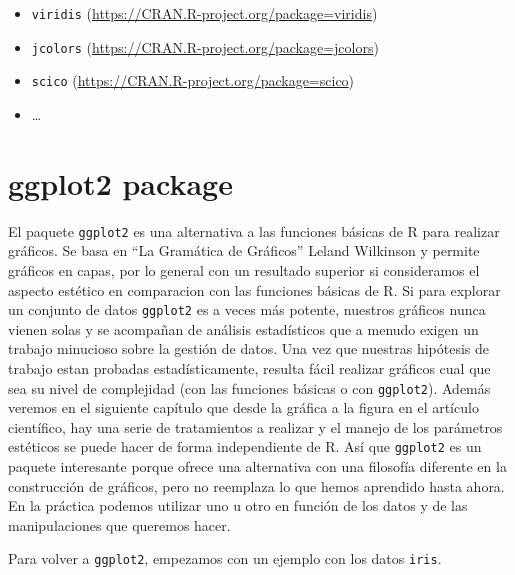 \documentclass[
]{book}
\providecommand{\tightlist}{%
  \setlength{\itemsep}{0pt}\setlength{\parskip}{0pt}}
\begin{document}
\begin{itemize}
\tightlist
\item
  \texttt{viridis} (\url{https://CRAN.R-project.org/package=viridis})
\item
  \texttt{jcolors} (\url{https://CRAN.R-project.org/package=jcolors})
\item
  \texttt{scico} (\url{https://CRAN.R-project.org/package=scico})
\item
  \ldots{}
\end{itemize}

\hypertarget{ggplot2-package}{%
\section{ggplot2 package}\label{ggplot2-package}}

El paquete \texttt{ggplot2} es una alternativa a las funciones básicas de R para realizar gráficos. Se basa en ``La Gramática de Gráficos'' Leland Wilkinson y permite gráficos en capas, por lo general con un resultado superior si consideramos el aspecto estético en comparacion con las funciones básicas de R. Si para explorar un conjunto de datos \texttt{ggplot2} es a veces más potente, nuestros gráficos nunca vienen solas y se acompañan de análisis estadísticos que a menudo exigen un trabajo minucioso sobre la gestión de datos. Una vez que nuestras hipótesis de trabajo estan probadas estadísticamente, resulta fácil realizar gráficos cual que sea su nivel de complejidad (con las funciones básicas o con \texttt{ggplot2}). Además veremos en el siguiente capítulo que desde la gráfica a la figura en el artículo científico, hay una serie de tratamientos a realizar y el manejo de los parámetros estéticos se puede hacer de forma independiente de R. Así que \texttt{ggplot2} es un paquete interesante porque ofrece una alternativa con una filosofía diferente en la construcción de gráficos, pero no reemplaza lo que hemos aprendido hasta ahora. En la práctica podemos utilizar uno u otro en función de los datos y de las manipulaciones que queremos hacer.

Para volver a \texttt{ggplot2}, empezamos con un ejemplo con los datos \texttt{iris}.
\end{document}

